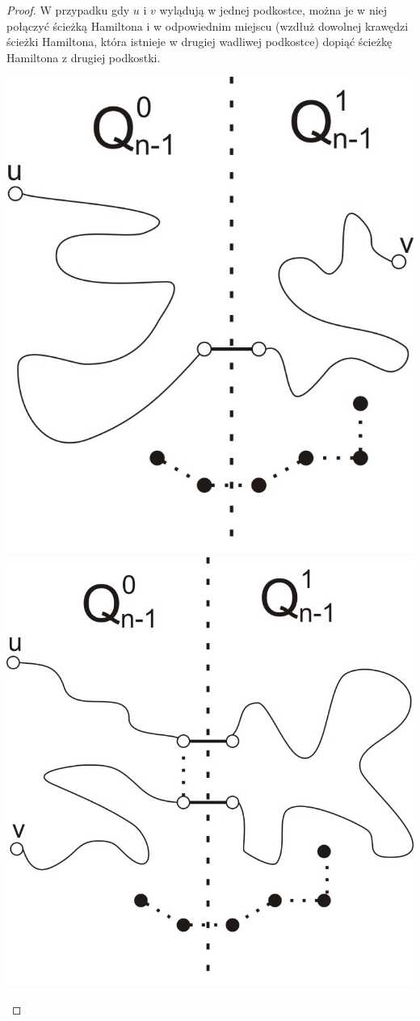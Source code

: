 \documentclass{pracamgr}
\begin{document}
\begin{proof}
     W przypadku gdy $u$ i $v$ wylądują w jednej podkostce, można je w niej połączyć ścieżką Hamiltona i w odpowiednim miejscu
     (wzdłuż dowolnej krawędzi ścieżki Hamiltona, która istnieje w drugiej wadliwej podkostce) dopiąć ścieżkę Hamiltona z drugiej podkostki.
     \begin{center}
      \includegraphics[scale=0.75]{img/Q_hamilton_p1.jpg}\quad\quad\quad\quad
      \includegraphics[scale=0.75]{img/Q_hamilton_p2.jpg}

\end{center}
\end{proof}
\end{document}

